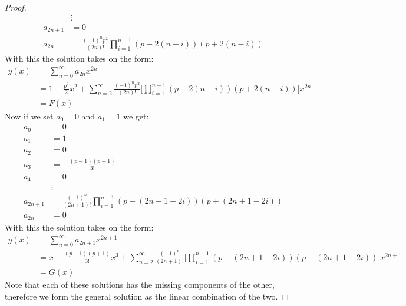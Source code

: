 \documentclass[12pt, letterpaper, onecolumn, conference, final]{IEEEtran}
\theoremstyle{definition}
\newtheorem{proposition}{Proposition}
\theoremstyle{plain}
\begin{document}
\begin{proof}
\begin{equation*}
\begin{split}
&\vdots \\
a_{2n + 1} &= 0 \\
a_{2n} &= \frac{(-1)^np^2}{(2n)!}\prod_{i = 1}^{n - 1} (p - 2(n - i))(p + 2(n - i))
\end{split}
\end{equation*}
With this the solution takes on the form:
\begin{equation*}
\begin{split}
y(x) &= \sum_{n = 0}^\infty a_{2n}x^{2n} \\
&= 1 - \frac{p^2}{2}x^2 + \sum_{n = 2}^\infty \frac{(-1)^np^2}{(2n)!} \Bigg[ \prod_{i = 1}^{n - 1} (p - 2(n - i))(p + 2(n - i)) \Bigg] x^{2n} \\
&= F(x)
\end{split}
\end{equation*}
Now if we set $a_0 = 0$ and $a_1 = 1$ we get:
\begin{equation*}
\begin{split}
a_0 &= 0 \\
a_1 &= 1 \\
a_2 &= 0 \\
a_3 &= -\frac{(p - 1)(p + 1)}{3!} \\
a_4 &= 0 \\
&\vdots \\
a_{2n + 1} &= \frac{(-1)^n}{(2n + 1)!}\prod_{i = 1}^{n - 1} (p - (2n + 1 - 2i))(p + (2n + 1 - 2i)) \\
a_{2n} &= 0
\end{split}
\end{equation*}
With this the solution takes on the form:
\begin{equation*}
\begin{split}
y(x) &= \sum_{n = 0}^\infty a_{2n + 1}x^{2n + 1} \\
&= x - \frac{(p - 1)(p + 1)}{3!}x^3 + \sum_{n = 2}^\infty \frac{(-1)^n}{(2n + 1)!} \Bigg[ \prod_{i = 1}^{n - 1} (p - (2n + 1 - 2i))(p + (2n + 1 - 2i)) \Bigg] x^{2n + 1} \\
&= G(x)
\end{split}
\end{equation*}
Note that each of these solutions has the missing components of the other, therefore we form the general solution as the linear combination of the two.
\end{proof}

\newpage
\begin{center}
\end{center}
\end{document}
